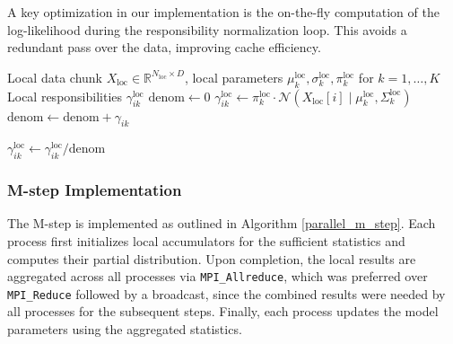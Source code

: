 A key optimization in our implementation is the on-the-fly computation of the log-likelihood during the responsibility normalization loop.
This avoids a redundant pass over the data, improving cache efficiency.
\begin{algorithm}[H]
    \caption{E-step: Computation of Responsibilities}
    \begin{algorithmic}[1]
        \Require Local data chunk $X_{\text{loc}} \in \mathbb{R}^{N_{\text{loc}} \times D}$, local parameters $\mu_{k}^{\text{loc}}, \sigma_{k}^{\text{loc}}, \pi_{k}^{\text{loc}}$ for $k=1,\dots,K$
        \Ensure Local responsibilities $\gamma_{ik}^{\text{loc}}$
            \State $\text{denom} \gets 0$
                \State $\gamma_{ik}^{\text{loc}}  \gets \pi_k^{\text{loc}} \cdot \mathcal{N}(X_{\text{loc}}[i] \mid \mu_k^{\text{loc}}, \Sigma_k^{\text{loc}})$ 
                \State $\text{denom} \gets \text{denom} + \gamma_{ik}$
            \EndFor

                \State $\gamma_{ik}^{\text{loc}} \gets \gamma_{ik}^{\text{loc}} / \text{denom}$ 
        \EndFor
        \EndFor
    \end{algorithmic}
    \label{e_step_parallel}
\end{algorithm}

\subsubsection*{M-step Implementation}
The M-step is implemented as outlined in Algorithm \ref{parallel_m_step}.
Each process first initializes local accumulators for the sufficient statistics and computes their partial distribution.
Upon completion, the local results are aggregated across all processes via \texttt{MPI\_Allreduce}, which was preferred over
\texttt{MPI\_Reduce} followed by a broadcast, since the combined results were needed by all processes for the subsequent steps.
Finally, each process updates the model parameters using the aggregated statistics.


